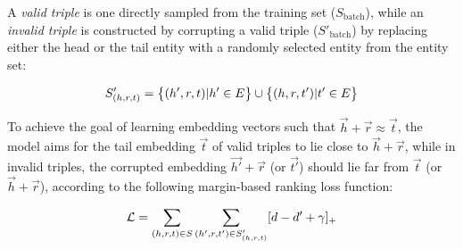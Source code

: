 A \textit{valid triple} is one directly sampled from the training set ($S_{\text{batch}}$), while an \textit{invalid triple} is constructed by corrupting a valid triple ($S'_{\text{batch}}$) by replacing either the head or the tail entity with a randomly selected entity from the entity set:

\begin{equation}
	\label{eq:sampleTransE}
	\centering
	S'_{(h, r, t)} = \big\{ (h', r, t) | h' \in E \big\} \cup \big\{ (h, r, t') | t' \in E \big\}
\end{equation}

To achieve the goal of learning embedding vectors such that $\overrightarrow{h} + \overrightarrow{r} \approx \overrightarrow{t}$, the model aims for the tail embedding $\overrightarrow{t}$ of valid triples to lie close to $\overrightarrow{h} + \overrightarrow{r}$, while in invalid triples, the corrupted embedding $\overrightarrow{h'} + \overrightarrow{r}$ (or $\overrightarrow{t'}$) should lie far from $\overrightarrow{t}$ (or $\overrightarrow{h} + \overrightarrow{r}$), according to the following margin-based ranking loss function:

\begin{equation}
	\label{eq:KBGATLoss}
	\centering
	\mathcal{L} = \sum_{(h, r, t) \in S} \sum_{(h', r, t') \in S'_{(h, r, t)}} [d - d' + \gamma]_{+}
\end{equation}


		
		
		
